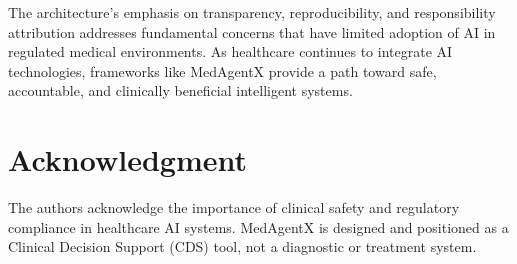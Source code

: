 \documentclass[conference]{IEEEtran}
\begin{document}
The architecture's emphasis on transparency, reproducibility, and responsibility attribution addresses fundamental concerns that have limited adoption of AI in regulated medical environments. As healthcare continues to integrate AI technologies, frameworks like MedAgentX provide a path toward safe, accountable, and clinically beneficial intelligent systems.

\section*{Acknowledgment}
The authors acknowledge the importance of clinical safety and regulatory compliance in healthcare AI systems. MedAgentX is designed and positioned as a Clinical Decision Support (CDS) tool, not a diagnostic or treatment system.

\end{document}

